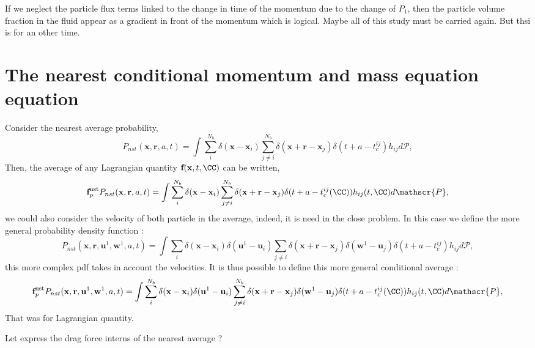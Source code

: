 If we neglect the particle flux terms linked to the change in time of the momentum due to the change of $P_1$, then the particle volume fraction in the fluid appear as a gradient in front of the momentum which is logical. 
Maybe all of this study must be carried again. 
But thsi is for an other time. 



\section{The nearest conditional momentum and mass equation equation}

Consider the nearest average probability,  
\begin{equation}
    P_{nst}(\textbf{x},\textbf{r},a,t)= 
    \int \sum_{i}^{N_b}\delta(\textbf{x}-\textbf{x}_i)
    \sum_{j\neq i}^{N_b}\delta(\textbf{x}+\textbf{r}-\textbf{x}_j) 
    \delta(t+a-t_c^{ij}) 
    h_{ij} d\mathscr{P},
\end{equation}
Then, the average of any Lagrangian quantity $\textbf{f}(\textbf{x},t,\CC)$ can be written, 
\begin{equation}
    \textbf{f}^\text{nst}_p P_{nst}(\textbf{x},\textbf{r},a,t)= 
    \int \sum_{i}^{N_b}\delta(\textbf{x}-\textbf{x}_i)
    \sum_{j\neq i}^{N_b}\delta(\textbf{x}+\textbf{r}-\textbf{x}_j) 
    \delta(t+a-t_c^{ij}(\CC)) 
    h_{ij}(t,\CC) d\mathscr{P},
\end{equation}
we could also consider the velocity of both particle in the average, indeed, it is need in the close problem.
In this case we define the more general probability density function :
\begin{equation}
    P_{nst}(\textbf{x},\textbf{r},\textbf{u}^1,\textbf{w}^1,a,t)= 
    \int \sum_{i}
    \delta(\textbf{x}-\textbf{x}_i)
    \delta(\textbf{u}^1-\textbf{u}_i)
    \sum_{j\neq i}
    \delta(\textbf{x}+\textbf{r}-\textbf{x}_j) 
    \delta(\textbf{w}^1 -\textbf{u}_j) 
    \delta(t+a-t_c^{ij}) 
    h_{ij} d\mathscr{P},
\end{equation}
this more complex pdf takes in account the velocities. 
It is thus possible to define this more general conditional average :
\begin{equation}
    \textbf{f}^\text{nst}_p P_{nst}(\textbf{x},\textbf{r},\textbf{u}^1,\textbf{w}^1,a,t)= 
    \int \sum_{i}^{N_b}\delta(\textbf{x}-\textbf{x}_i)
    \delta(\textbf{u}^1-\textbf{u}_i)
    \sum_{j\neq i}^{N_b}\delta(\textbf{x}+\textbf{r}-\textbf{x}_j) 
    \delta(\textbf{w}^1 -\textbf{u}_j) 
    \delta(t+a-t_c^{ij}(\CC)) 
    h_{ij}(t,\CC) d\mathscr{P},
\end{equation}
That was for Lagrangian quantity. 


Let express the drag force interns of the nearest average ? 

